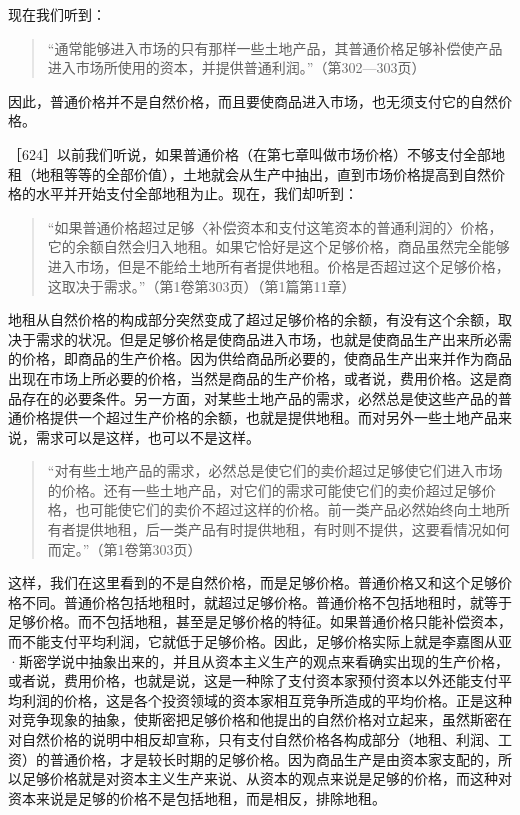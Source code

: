 现在我们听到：

\begin{quote}{“通常能够进入市场的只有那样一些土地产品，其普通价格足够补偿使产品进入市场所使用的资本，并提供普通利润。”（第302—303页）}\end{quote}

因此，普通价格并不是自然价格，而且要使商品进入市场，也无须支付它的自然价格。

［624］以前我们听说，如果普通价格（在第七章叫做市场价格）不够支付全部地租（地租等等的全部价值），土地就会从生产中抽出，直到市场价格提高到自然价格的水平并开始支付全部地租为止。现在，我们却听到：

\begin{quote}{“如果普通价格超过足够〈补偿资本和支付这笔资本的普通利润的〉价格，它的余额自然会归入地租。如果它恰好是这个足够价格，商品虽然完全能够进入市场，但是不能给土地所有者提供地租。价格是否超过这个足够价格，这取决于需求。”（第1卷第303页）（第1篇第11章）}\end{quote}

地租从自然价格的构成部分突然变成了超过足够价格的余额，有没有这个余额，取决于需求的状况。但是足够价格是使商品进入市场，也就是使商品生产出来所必需的价格，即商品的生产价格。因为供给商品所必要的，使商品生产出来并作为商品出现在市场上所必要的价格，当然是商品的生产价格，或者说，费用价格。这是商品存在的必要条件。另一方面，对某些土地产品的需求，必然总是使这些产品的普通价格提供一个超过生产价格的余额，也就是提供地租。而对另外一些土地产品来说，需求可以是这样，也可以不是这样。

\begin{quote}{“对有些土地产品的需求，必然总是使它们的卖价超过足够使它们进入市场的价格。还有一些土地产品，对它们的需求可能使它们的卖价超过足够价格，也可能使它们的卖价不超过这样的价格。前一类产品必然始终向土地所有者提供地租，后一类产品有时提供地租，有时则不提供，这要看情况如何而定。”（第1卷第303页）}\end{quote}

这样，我们在这里看到的不是自然价格，而是足够价格。普通价格又和这个足够价格不同。普通价格包括地租时，就超过足够价格。普通价格不包括地租时，就等于足够价格。而不包括地租，甚至是足够价格的特征。如果普通价格只能补偿资本，而不能支付平均利润，它就低于足够价格。因此，足够价格实际上就是李嘉图从亚·斯密学说中抽象出来的，并且从资本主义生产的观点来看确实出现的生产价格，或者说，费用价格，也就是说，这是一种除了支付资本家预付资本以外还能支付平均利润的价格，这是各个投资领域的资本家相互竞争所造成的平均价格。正是这种对竞争现象的抽象，使斯密把足够价格和他提出的自然价格对立起来，虽然斯密在对自然价格的说明中相反却宣称，只有支付自然价格各构成部分（地租、利润、工资）的普通价格，才是较长时期的足够价格。因为商品生产是由资本家支配的，所以足够价格就是对资本主义生产来说、从资本的观点来说是足够的价格，而这种对资本来说是足够的价格不是包括地租，而是相反，排除地租。

